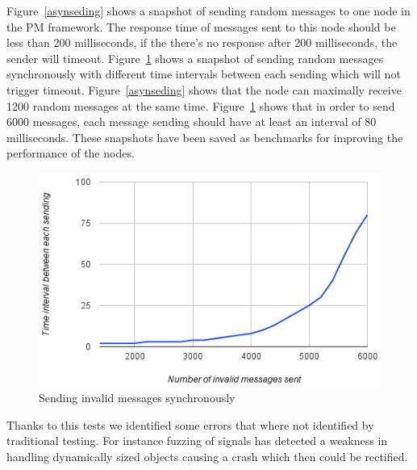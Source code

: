 Figure~\ref{asynseding} shows a snapshot of sending random messages to one node in the PM framework. The response time of messages sent to this node should be less than 200 milliseconds, if the there's no response after 200 milliseconds, the sender will timeout. Figure~\ref{synchsending} shows a snapshot of sending random messages synchronously with different time intervals between each sending which will not trigger timeout. Figure~\ref{asynseding} shows that the node can maximally receive 1200 random messages at the same time. Figure~\ref{synchsending} shows that in order to send 6000 messages, each message sending should have at least an interval of 80 milliseconds. These snapshots have been saved as benchmarks for improving the performance of the nodes.


\begin{figure}[hh!]
\centering
\includegraphics[width=\columnwidth]{figure/synchsending.png}
\caption{Sending invalid messages synchronously \label{synchsending}}
\end{figure}

Thanks to this tests we identified some errors that where not identified by traditional testing. For instance fuzzing of signals has detected a weakness in handling dynamically sized objects causing a crash which then could be rectified.

